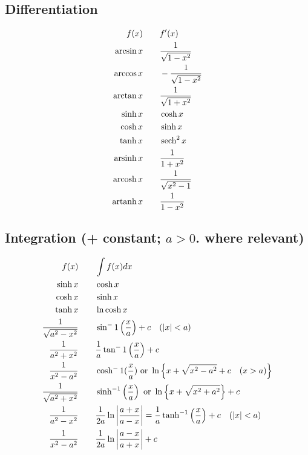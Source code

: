     \subsection{Differentiation}
    \begin{alignat}{2}
        f(x)&\qquad f'(x) \notag\\
        \arcsin x&\qquad\frac{1}{\sqrt{1-x^2}} \\
        \arccos x&\qquad-\frac{1}{\sqrt{1-x^2}} \\
        \arctan x&\qquad\frac{1}{\sqrt{1+x^2}} \\
        \sinh x&\qquad\cosh x \\
        \cosh x&\qquad\sinh x \\
        \tanh x&\qquad\operatorname{sech}^2x \\
        \operatorname{arsinh} x&\qquad\frac{1}{1+x^2} \\
        \operatorname{arcosh} x&\qquad\frac{1}{\sqrt{x^2-1}} \\
        \operatorname{artanh} x&\qquad \frac{1}{1-x^2}\\
    \end{alignat}

    \subsection{Integration (+ constant; \texorpdfstring{$a>0$}{a > 0}. where relevant)}
    \begin{alignat}{2}
        f(x)&\qquad \int f(x)dx \notag\\
        \sinh x&\qquad\cosh x \\
        \cosh x&\qquad\sinh x \\
        \tanh x&\qquad\ln\cosh x \\
        \frac{1}{\sqrt{a^2-x^2}}&\qquad\sin^-1\left(\frac{x}{a}\right)+c\quad(|x|<a) \\
        \frac{1}{a^2+x^2}&\qquad\frac{1}{a}\tan^-1\left(\frac{x}{a}\right)+c \\
        \frac{1}{x^2-a^2}&\qquad\cosh^-1(\frac{x}{a})\ \text{or}\ \ln\left\{x+\sqrt{x^2-a^2}+c\quad(x>a)\right\} \\
        \frac{1}{\sqrt{a^2+x^2}}&\qquad\sinh^{-1}\left(\frac{x}{a}\right)\ \text{or}\ \ln\left\{x+\sqrt{x^2+a^2}\right\}+c \\
        \frac{1}{a^2-x^2}&\qquad\frac{1}{2a}\ln\left|\frac{a+x}{a-x}\right|=\frac{1}{a}\tanh^{-1}\left(\frac{x}{a}\right)+c\quad(|x|<a) \\
        \frac{1}{x^2-a^2}&\qquad\frac{1}{2a}\ln\left|\frac{a-x}{a+x}\right|+c
    \end{alignat}

